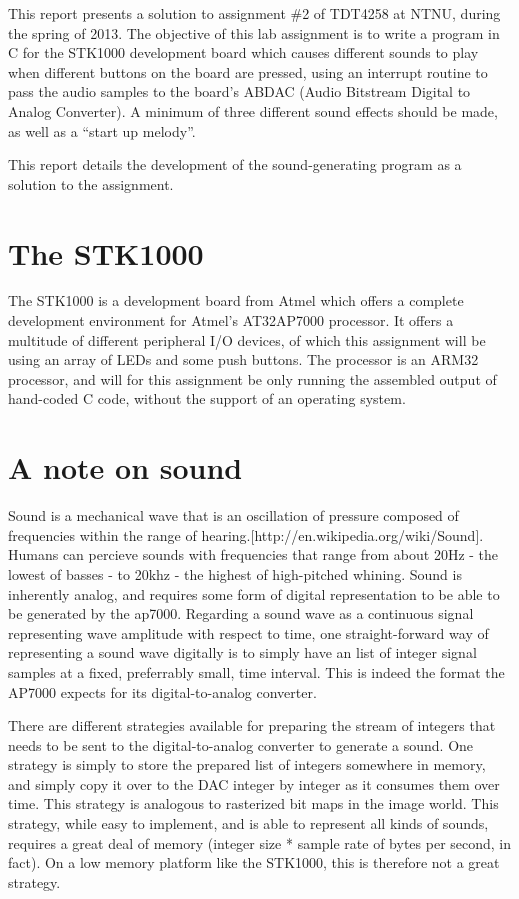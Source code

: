 This report presents a solution to assignment \#2 of TDT4258 at NTNU, during the spring of 2013.
The objective of this lab assignment is to write a program in C for the STK1000 development board which causes different sounds to play when different buttons on the board are pressed, using an interrupt routine to pass the audio samples to the board's ABDAC (Audio Bitstream Digital to Analog Converter).
A minimum of three different sound effects should be made, as well as a ``start up melody''.

This report details the development of the sound-generating program as a solution to the assignment.
\section{The STK1000}
The STK1000 is a development board from Atmel which offers a complete development environment for Atmel's AT32AP7000 processor.
It offers a multitude of different peripheral I/O devices, of which this assignment will be using an array of LEDs and some push buttons.
The processor is an ARM32 processor, and will for this assignment be only running the assembled output of hand-coded C code, without the support of an operating system.

\section{A note on sound}
Sound is a mechanical wave that is an oscillation of pressure composed of frequencies within the range of hearing.[http://en.wikipedia.org/wiki/Sound].
Humans can percieve sounds with frequencies that range from about 20Hz - the lowest of basses - to 20khz - the highest of high-pitched whining.
Sound is inherently analog, and requires some form of digital representation to be able to be generated by the ap7000.
Regarding a sound wave as a continuous signal representing wave amplitude with respect to time, one straight-forward way of representing a sound wave digitally is to simply have an list of integer signal samples at a fixed, preferrably small, time interval.
This is indeed the format the AP7000 expects for its digital-to-analog converter.

There are different strategies available for preparing the stream of integers that needs to be sent to the digital-to-analog converter to generate a sound.
One strategy is simply to store the prepared list of integers somewhere in memory, and simply copy it over to the DAC integer by integer as it consumes them over time.
This strategy is analogous to rasterized bit maps in the image world.
This strategy, while easy to implement, and is able to represent all kinds of sounds, requires a great deal of memory (integer size * sample rate of bytes per second, in fact).
On a low memory platform like the STK1000, this is therefore not a great strategy.

